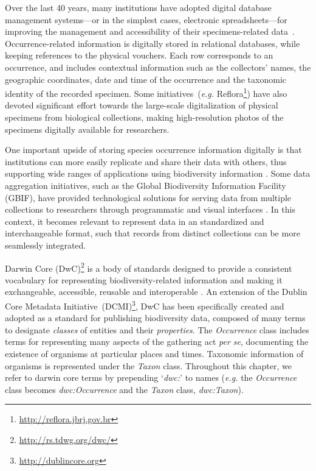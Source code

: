\clearpage


Over the last 40 years, many institutions have adopted digital database management systems---or in the simplest cases, electronic spreadsheets---for improving the management and accessibility of their specimens-related data~\cite{Sunderland2013}.
Occurrence-related information is digitally stored in relational databases, while keeping references to the physical vouchers.
Each row corresponds to an occurrence, and includes contextual information such as the collectors' names, the geographic coordinates, date and time of the occurrence and the taxonomic identity of the recorded specimen.
Some initiatives~(\textit{e.g.} Reflora\footnote{\url{http://reflora.jbrj.gov.br}}) have also devoted significant effort towards the large-scale digitalization of physical specimens from biological collections, making high-resolution photos of the specimens digitally available for researchers.

One important upside of storing species occurrence information digitally is that institutions can more easily replicate and share their data with others, thus supporting wide ranges of applications using biodiversity information \cite{Newbold2010}.
Some data aggregation initiatives, such as the Global Biodiversity Information Facility (GBIF), have provided technological solutions for serving data from multiple collections to researchers through programmatic and visual interfaces \cite{gbif}.
In this context, it becomes relevant to represent data in an standardized and interchangeable format, such that records from distinct collections can be more seamlessly integrated.

Darwin Core (DwC)\footnote{\url{http://rs.tdwg.org/dwc/}} is a body of standards designed to provide a consistent vocabulary for representing biodiversity-related information and making it exchangeable, accessible, reusable and interoperable \cite{Wieczorek2012}.
An extension of the Dublin Core Metadata Initiative~(DCMI)\footnote{\url{http://dublincore.org}}, DwC has been specifically created and adopted as a standard for publishing biodiversity data, composed of many terms to designate \textit{classes} of entities and their \textit{properties}.
The \textit{Occurrence} class includes terms for representing many aspects of the gathering act \textit{per se}, documenting the existence of organisms at particular places and times.
Taxonomic information of organisms is represented under the \textit{Taxon} class.
Throughout this chapter, we refer to darwin core terms by prepending `\textit{dwc:}' to names (\textit{e.g.} the \textit{Occurrence} class becomes \textit{dwc:Occurrence} and the \textit{Taxon} class, \textit{dwc:Taxon}). 



